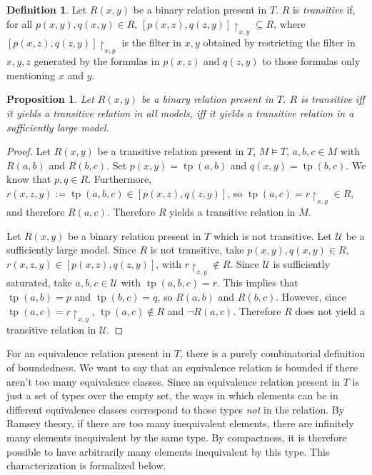 \documentclass[letterpaper,twoside]{article}
\newtheorem{proposition}[theorem]{Proposition}
\theoremstyle{definition}
\newtheorem{definition}[theorem]{Definition}
\theoremstyle{remark}
\newcommand{\defterm}[1]{\emph{#1}}
\DeclareMathOperator{\tp}{tp}
\begin{document}
\begin{definition}
  Let \(R(x,y)\) be a binary relation present in \(T\).  \(R\) is
  \defterm{transitive} if, for all \(p(x,y), q(x,y) \in R\),
  \([p(x,z), q(z,y)]\restriction_{x,y} \subseteq R\), where \([p(x,z),
    q(z,y)]\restriction_{x,y}\) is the filter in \(x,y\) obtained by
  restricting the filter in \(x,y,z\) generated by the formulas in
  \(p(x,z)\) and \(q(z,y)\) to those formulas only mentioning \(x\)
  and \(y\).
\end{definition}

\begin{proposition}
  Let \(R(x,y)\) be a binary relation present in \(T\).  \(R\) is
  transitive iff it yields a transitive relation in all models, iff it
  yields a transitive relation in a sufficiently large model.
\end{proposition}
\begin{proof}
  Let \(R(x,y)\) be a transitive relation present in \(T\), \(M
  \models T\), \(a,b,c \in M\) with \(R(a,b)\) and \(R(b,c)\).  Set
  \(p(x,y) = \tp(a,b)\) and \(q(x,y) = \tp(b,c)\).  We know that \(p,q
  \in R\).  Furthermore, \(r(x,z,y) := \tp(a,b,c) \in [p(x,z),
    q(z,y)]\), so \(\tp(a,c) = r\restriction_{x,y} \in R\), and
  therefore \(R(a,c)\).  Therefore \(R\) yields a transitive relation
  in \(M\).

  Let \(R(x,y)\) be a binary relation present in \(T\) which is not
  transitive.  Let \(\mathcal{U}\) be a sufficiently large model.
  Since \(R\) is not transitive, take \(p(x,y), q(x,y) \in R\),
  \(r(x,z,y) \in [p(x,z), q(z,y)]\), with \(r\restriction_{x,y} \notin
  R\).  Since \(\mathcal{U}\) is sufficiently saturated, take \(a,b,c
  \in \mathcal{U}\) with \(\tp(a,b,c) = r\).  This implies that
  \(\tp(a,b) = p\) and \(\tp(b,c) = q\), so \(R(a,b)\) and \(R(b,c)\).
  However, since \(\tp(a,c) = r\restriction_{x,y}\), \(\tp(a,c) \notin
  R\) and \(\neg R(a,c)\).  Therefore \(R\) does not yield a
  transitive relation in \(\mathcal{U}\).
\end{proof}

For an equivalence relation present in \(T\), there is a purely
combinatorial definition of boundedness.  We want to say that an
equivalence relation is bounded if there aren't too many equivalence
classes.  Since an equivalence relation present in \(T\) is just a set
of types over the empty set, the ways in which elements can be in
different equivalence classes correspond to those types \emph{not} in
the relation.  By Ramsey theory, if there are too many inequivalent
elements, there are infinitely many elements inequivalent by the same
type.  By compactness, it is therefore possible to have arbitrarily
many elements inequivalent by this type.  This characterization is
formalized below.
\end{document}
